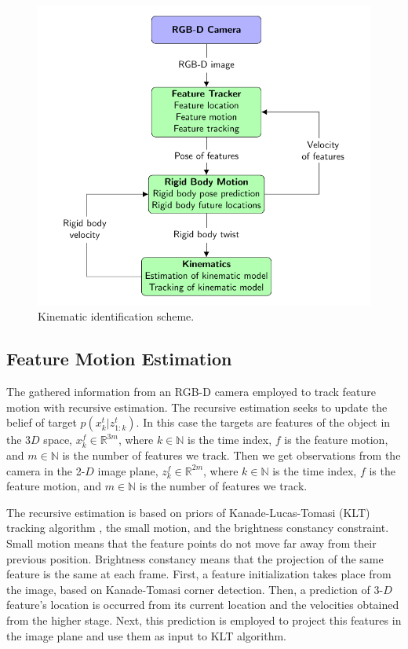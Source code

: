 \documentclass[letterpaper, 10 pt, conference]{ieeeconf}
\begin{document}
\begin{figure}[!h]
	\includegraphics[scale=0.70]{figures/RecursiveEstimation.pdf}
	\centering
	\caption{Kinematic identification scheme.}
	\label{RE}
\end{figure}

\subsection{Feature Motion Estimation}\label{fme}
The gathered information from an RGB-D camera employed to track feature motion with recursive estimation. The recursive estimation seeks to update the belief of target $p(x_k^t|z_{1:k}^t)$. In this case the targets are features of the object in the $3D$ space, $x_k^f \in \mathbb{R}^{3m}$, where $k \in \mathbb{N}$ is the time index, $f$ is the feature motion, and $m \in \mathbb{N}$ is the number of features we track. Then we get observations from the camera in the 2-$D$ image plane, $z_k^f \in \mathbb{R}^{2m}$, where $k \in \mathbb{N}$ is the time index, $f$ is the feature motion, and $m \in \mathbb{N}$ is the number of features we track. 

The recursive estimation is based on priors of Kanade-Lucas-Tomasi (KLT) tracking algorithm \cite{tomasi1991detection}, \cite{lucas1981iterative} the small motion, and the brightness constancy constraint. Small motion means that the feature points do not move far away from their previous position. Brightness constancy means that the projection of the same feature is the same at each frame. 
First, a feature initialization takes place from the image, based on Kanade-Tomasi corner detection. Then, a prediction of 3-$D$ feature's location is occurred from its current location and the velocities obtained from the higher stage. Next, this prediction is employed to project this features in the image plane and use them as input to KLT algorithm. 
\end{document}
